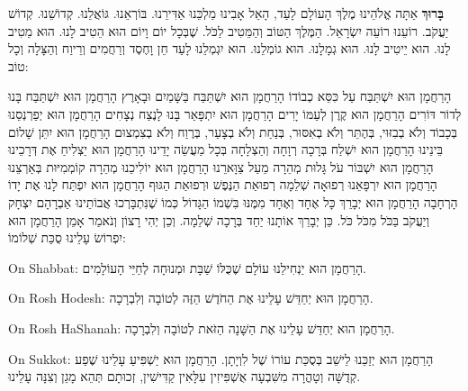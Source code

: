 \textbf{בָּרוּךְ} אַתָּה \Shem{} אֱלֹהֵינוּ מֶלֶךְ הָעוֹלָם לָעַד, הָאֵל אָבִינוּ מַלְכֵּנוּ אַדִּירֵנוּ. בּוֹרְאֵנוּ. גּוֹאֲלֵנוּ. קְדוֹשֵׁנוּ. קְדוֹשׁ יַעֲקֹב. רוֹעֵנוּ רוֹעֵה יִשְׂרָאֵל. הַמֶּלֶךְ הַטּוֹב וְהַמֵּטִיב לַכֹּל. שֶׁבְּכָל יוֹם וָיוֹם הוּא הֵטִיב לָנוּ. הוּא מֵטִיב לָנוּ. הוּא יֵיטִיב לָנוּ. הוּא גְמָלָנוּ. הוּא גוֹמְלֵנוּ. הוּא יִגְמְלֵנוּ לָעַד חֵן וָחֶסֶד וְרַחֲמִים וְרֵיוַח וְהַצָּלָה וְכָל טוֹב:

הָרַחֲמָן הוּא יִשְׁתַּבַּח עַל כִּסֵּא כְבוֹדוֹ הָרַחֲמָן הוּא יִשְׁתַּבַּח בַּשָּׁמַיִם וּבָאָרֶץ הָרַחֲמָן הוּא יִשְׁתַּבַּח בָּנוּ לְדוֹר דּוֹרִים הָרַחֲמָן הוּא קֶרֶן לְעַמּוֹ יָרִים הָרַחֲמָן הוּא יִתְפָּאַר בָּנוּ לָנֶצַח נְצָחִים הָרַחֲמָן הוּא יְפַרְנְסֵנוּ בְּכָבוֹד וְלֹא בְבִזּוּי, בְּהֶתֵּר וְלֹא בְאִסּוּר, בְּנַחַת וְלֹא בְצָעַר, בְּרֶוַח וְלֹא בְצִמְצוּם הָרַחֲמָן הוּא יִתֵּן שָׁלוֹם בֵּינֵינוּ הָרַחֲמָן הוּא יִשְׁלַח בְּרָכָה רְוָחָה וְהַצְלָחָה בְּכָל מַעֲשֵׂה יָדֵינוּ הָרַחֲמָן הוּא יַצְלִיחַ אֶת דְּרָכֵינוּ הָרַחֲמָן הוּא יִשְׁבּוֹר עֹל גָּלוּת מְהֵרָה מֵעַל צַוָּארֵנוּ הָרַחֲמָן הוּא יוֹלִיכֵנוּ מְהֵרָה קוֹמְמִיּוּת בְּאַרְצֵנוּ הָרַחֲמָן הוּא יִרְפָּאֵנוּ רְפוּאָה שְׁלֵמָה רְפוּאַת הַנֶּפֶשׁ וּרְפוּאַת הַגּוּף הָרַחֲמָן הוּא יִפְתַּח לָנוּ אֶת יָדוֹ הָרְחָבָה הָרַחֲמָן הוּא יְבָרֵךְ כָּל אֶחָד וְאֶחָד מִמֶּנּוּ בִּשְׁמוֹ הַגָּדוֹל כְּמוֹ שֶׁנִּתְבָּרְכוּ אֲבוֹתֵינוּ אַבְרָהָם יִצְחָק וְיַעֲקֹב בַּכֹּל מִכֹּל כֹּל. כֵּן יְבָרֵךְ אוֹתָנוּ יַחַד בְּרָכָה שְׁלֵמָה. וְכֵן יְהִי רָצוֹן וְנֹאמַר אָמֵן הָרַחֲמָן הוּא יִפְרוֹשׂ עָלֵינוּ סֻכַּת שְׁלוֹמוֹ:

\begin{seasonal}{On Shabbat:}
הָרַחֲמָן הוּא יַנְחִילֵנוּ עוֹלָם שֶׁכֻּלּוֹ שַׁבָּת וּמְנוּחָה לְחַיֵּי הָעוֹלָמִים.
\end{seasonal}

\begin{seasonal}{On Rosh Hodesh:}
הָרַחֲמָן הוּא יְחַדֵּשׁ עָלֵינוּ אֶת הַחֹדֶשׁ הַזֶּה לְטוֹבָה וְלִבְרָכָה.
\end{seasonal}

\begin{seasonal}{On Rosh HaShanah:}
הָרַחֲמָן הוּא יְחַדֵּשׁ עָלֵינוּ אֶת הַשָּׁנָה הַזֹּאת לְטוֹבָה וְלִבְרָכָה.
\end{seasonal}

\begin{seasonal}{On Sukkot:}
הָרַחֲמָן הוּא יְזַכֵּנוּ לֵישֵׁב בְּסֻכַּת עוֹרוֹ שֶׁל לִוְיָתָן. הָרַחֲמָן הוּא יַשְׁפִּיעַ עָלֵינוּ שֶׁפַע קְדֻשָּׁה וְטָהֳרָה מִשִּׁבְעָה אֻשְׁפִּיזִין עִלָּאִין קַדִּישִׁין, זְכוּתָם תְּהֵא מָגֵן וְצִנָּה עָלֵינוּ.
\end{seasonal}

